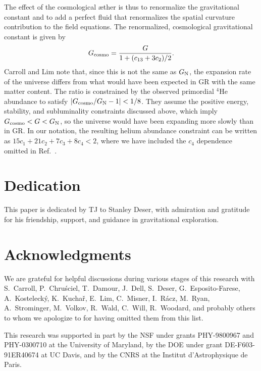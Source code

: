 \documentclass[aps]{ws-procs9x6}
\def\beq{\begin{equation}}
\def\eeq{\end{equation}}
\begin{document}
The effect of the cosmological {\ae}ther is thus to renormalize
the gravitational constant and to add a perfect fluid that
renormalizes the spatial curvature contribution to the field
equations. The renormalized, cosmological gravitational constant
is given by\cite{CLim}
%
\beq
G_{\rm cosmo}=\frac{G}{1+(c_{13}+3c_2)/2}.
\eeq
%
Carroll and Lim\cite{CLim} note that, since this
is not the same as $G_{\rm N}$, the expansion rate
of the universe differs from what would have been expected
in GR with the same matter content. The ratio is constrained
by the observed primordial ${}^4$He abundance to satisfy
$|G_{\rm cosmo}/G_{\rm N} - 1|<1/8$.
They assume the positive energy, stability, and subluminality
constraints discussed above, which imply
$G_{\rm cosmo}<G<G_{\rm N}$, so the universe would have
been expanding more slowly than in GR.
In our notation, the resulting helium abundance constraint
can be written as $15 c_1 + 21c_2+7c_3+8c_4<2$, where we have
included the $c_4$ dependence omitted in Ref.~.


\section*{Dedication}

This paper is dedicated by TJ to Stanley Deser, with admiration
and gratitude for his friendship, support, and guidance in
gravitational exploration.


\section*{Acknowledgments}

We are grateful for helpful discussions during various stages of
this research with S.~Carroll, P.~Chru\'{s}ciel, T.~Damour,
J.~Dell, S.~Deser, G.~Esposito-Farese, A.~Kosteleck\'y,
K.~Kucha\v{r}, E.~Lim, C.~Misner, I.~R\'{a}cz, M.~Ryan,
A.~Strominger, M.~Volkov, R.~Wald, C.~Will, R.~Woodard, and
probably others to whom we apologize to for having omitted them
from this list.

This research was supported in part by the NSF under grants
PHY-9800967 and PHY-0300710 at the University of Maryland, by the
DOE under grant DE-F603-91ER40674 at UC Davis, and by the CNRS
at the Institut d'Astrophysique de Paris.
\end{document}
